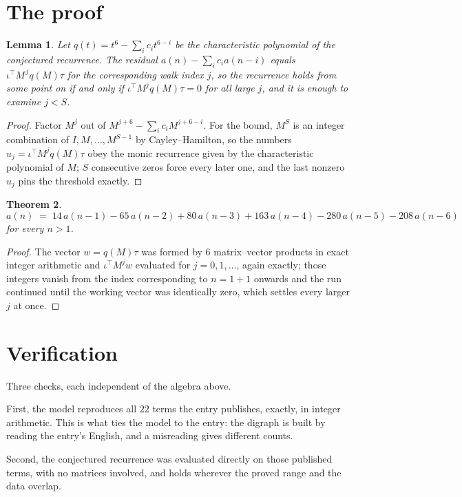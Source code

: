 \documentclass[11pt,a4paper]{article}
\theoremstyle{plain}
\newtheorem{theorem}{Theorem}
\newtheorem{lemma}[theorem]{Lemma}
\theoremstyle{definition}
\begin{document}
\section{The proof}

\begin{lemma}\label{lem:crit}
Let $q(t)=t^{6}-\sum_i c_it^{6-i}$ be the characteristic polynomial of the
conjectured recurrence. The residual $a(n)-\sum_ic_ia(n-i)$ equals
$\iota^{\!\top}M^{\,j}q(M)\tau$ for the corresponding walk index $j$, so the recurrence
holds from some point on if and only if $\iota^{\!\top}M^{j}q(M)\tau=0$ for all large $j$,
and it is enough to examine $j<S$.
\end{lemma}

\begin{proof}
Factor $M^{j}$ out of $M^{j+6}-\sum_ic_iM^{j+6-i}$. For the bound, $M^{S}$
is an integer combination of $I,M,\dots,M^{S-1}$ by Cayley--Hamilton, so the numbers
$u_j=\iota^{\!\top}M^{j}q(M)\tau$ obey the monic recurrence given by the characteristic
polynomial of $M$; $S$ consecutive zeros force every later one, and the last nonzero $u_j$
pins the threshold exactly.
\end{proof}

\begin{theorem}
\[
a(n)\;=\;14\,a(n-1) - 65\,a(n-2) + 80\,a(n-3) + 163\,a(n-4) - 280\,a(n-5) - 208\,a(n-6)
\]
for every $n>1$.
\end{theorem}

\begin{proof}
The vector $w=q(M)\tau$ was formed by $6$ matrix--vector products in exact integer
arithmetic and $\iota^{\!\top}M^{j}w$ evaluated for $j=0,1,\dots$, again exactly; those
integers vanish from the index corresponding to $n=1+1$ onwards and the run continued
until the working vector was identically zero, which settles every larger $j$ at once.
\end{proof}

\section{Verification}

Three checks, each independent of the algebra above.

First, the model reproduces all $22$ terms the entry publishes, exactly, in integer
arithmetic. This is what ties the model to the entry: the digraph is built by reading the
entry's English, and a misreading gives different counts.

Second, the conjectured recurrence was evaluated directly on those published terms, with no
matrices involved, and holds wherever the proved range and the data overlap.
\end{document}
